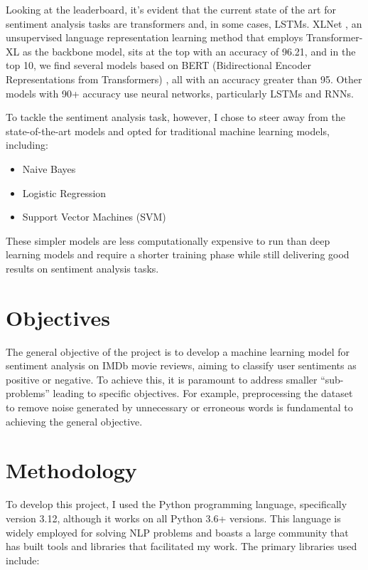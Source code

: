 \documentclass{article}
\begin{document}
Looking at the leaderboard, it’s evident that the current state of the art for sentiment analysis tasks are transformers and, in some cases, LSTMs. XLNet \cite{yang2019xlnet}, an unsupervised language representation learning method that employs Transformer-XL as the backbone model, sits at the top with an accuracy of 96.21, and in the top 10, we find several models based on BERT (Bidirectional Encoder Representations from Transformers) \cite{devlin2019bert}, all with an accuracy greater than 95. Other models with 90+ accuracy use neural networks, particularly LSTMs and RNNs.

To tackle the sentiment analysis task, however, I chose to steer away from the state-of-the-art models and opted for traditional machine learning models, including:
\begin{itemize}
    \item Naive Bayes
    \item Logistic Regression
    \item Support Vector Machines (SVM)
\end{itemize}

These simpler models are less computationally expensive to run than deep learning models and require a shorter training phase while still delivering good results on sentiment analysis tasks.

\newpage

\section{Objectives}

The general objective of the project is to develop a machine learning model for sentiment analysis on IMDb movie reviews, aiming to classify user sentiments as positive or negative. To achieve this, it is paramount to address smaller “sub-problems” leading to specific objectives. For example, preprocessing the dataset to remove noise generated by unnecessary or erroneous words is fundamental to achieving the general objective.

\newpage

\section{Methodology}

To develop this project, I used the Python programming language, specifically version 3.12, although it works on all Python 3.6+ versions. This language is widely employed for solving NLP problems and boasts a large community that has built tools and libraries that facilitated my work. The primary libraries used include:
\end{document}
